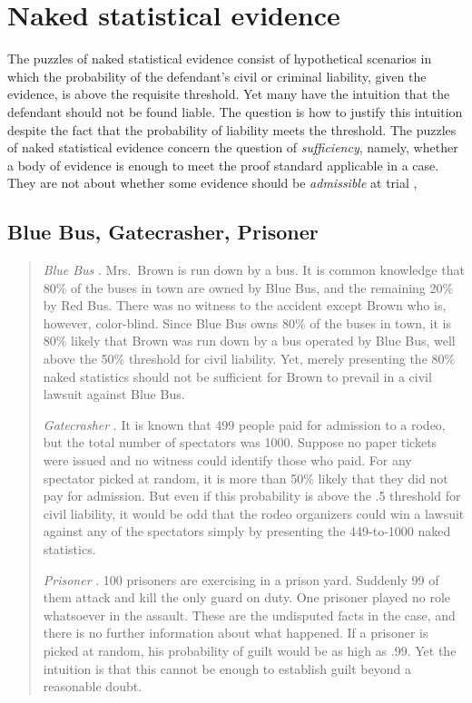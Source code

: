 \documentclass{article}
\begin{document}
\section{Naked statistical evidence}\label{sec:naked}



The puzzles of naked statistical evidence consist 
of hypothetical scenarios in which the probability of the defendant's 
civil or criminal liability, given the evidence, is above the requisite threshold. Yet many have the intuition that the defendant should not be found liable. The question is how to justify this intuition despite the fact that the probability of liability meets the threshold. The puzzles of naked statistical 
evidence concern the question of \textit{sufficiency}, namely, whether a body of evidence is enough to meet the proof standard applicable in a case. They are not about whether some evidence should be \textit{admissible} at trial \cite[on the distinction, see][]{picinali16}, 


\subsection{Blue Bus, Gatecrasher, Prisoner}

\begin{quote}
\textit{Blue Bus} \citep{tribe71}. Mrs.\ Brown is run down by a bus. It is common knowledge that 80\% of the buses in town are owned by Blue Bus, and the remaining 20\% by Red Bus. There was no witness to the accident except Brown who is, however, color-blind. Since Blue Bus owns 80\% of the buses in town, it is 80\% likely that Brown was run down by a bus operated by Blue Bus, well above the 50\% threshold for civil liability.  Yet, merely presenting the 80\% naked statistics should not be sufficient for Brown to prevail in a civil lawsuit against Blue Bus.


\textit{Gatecrasher} \citep{Cohen1977The-probable-an}. It is known that 499 people paid for
admission to a rodeo, but the total number of spectators was 1000. Suppose no paper tickets were issued and 
no witness could identify 
those who paid.  For any spectator picked at random, it is more than 50\% likely that they did not pay for admission. But even if this probability is above the .5 threshold for civil liability, it would be odd that the rodeo organizers could win a lawsuit against any of the spectators simply by presenting the 449-to-1000 naked statistics. 


\textit{Prisoner} \citep{Nesson1979Reasonable-doub}. 100 prisoners are exercising in a prison yard. Suddenly 99 of them attack and kill the only guard on duty. One prisoner played no role whatsoever in the assault. These are the undisputed facts in the case, and there is no further information about what happened. If a prisoner is picked at random, his probability of guilt would be as high as .99.  Yet the intuition is that this cannot be enough to establish guilt beyond a reasonable doubt. 
\end{quote}
\end{document}

